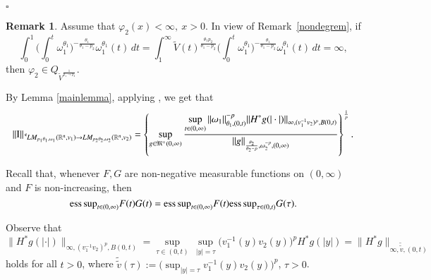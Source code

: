 \documentclass[11pt]{amsart}
\theoremstyle{plain}
\theoremstyle{definition}
\newtheorem{rem}[thm]{Remark}
\numberwithin{thm}{section}
\numberwithin{equation}{section}
\begin{document}
\hspace{16.9cm}$\square$

\begin{rem}
	Assume that ${\varphi}_2(x) < \infty, ~ x > 0$. In view of
	Remark~\ref{nondegrem}, if
	$$
	\int_0^1 \bigg(\int_0^t  {\omega}_1^{{\theta}_1} \bigg)^{-\frac{{\theta}_1}{{\theta}_1 - p_2}}
	{\omega}_1^{{\theta}_1}(t) \,dt = \int_1^{\infty} \widetilde V(t)^{\frac{{\theta}_1 p_2}{{\theta}_1 - p_2}}
	\bigg(\int_0^t  {\omega}_1^{{\theta}_1} \bigg)^{-\frac{{\theta}_1}{{\theta}_1-p_2}} {\omega}_1^{{\theta}_1}(t) \,dt = \infty,
	$$
	then ${\varphi}_2 \in Q_{\widetilde V^{\frac{1}{p_1 {\rightarrow} p_2}}}$.
\end{rem}

By  Lemma \ref{mainlemma}, applying \cite[Theorem~4.2, (b)]{mu_emb},  we get that
\begin{align*}
\|{\operatorname{I}}\|_{{\,^{^{\bf c}}\!} LM_{p_1{\theta}_1,{\omega}_1}({{\mathbb R}^n},v_1){\rightarrow} LM_{p_2{\theta}_2,{\omega}_2}({{\mathbb R}^n},v_2)} = \left\{ \sup_{g\in {\mathfrak M}^+(0,\infty)} {\frac{\displaystyle {\sup_{t\in (0,\infty)} \|{\omega}_1\|_{{\theta}_1,(0,t)}^{-p} \|H^*g(|\cdot|)\|_{\infty,(v_1^{-1}v_2)^{p},B(0,t)}}}{\displaystyle {\|g\|_{\frac{{\theta}_2}{{\theta}_2-p},{\omega}_2^{-p},(0,\infty)}}}} \right\}^{\frac{1}{p}}.
\end{align*}

Recall that, whenever $F,G$ are non-negative measurable functions on $(0,\infty)$ and $F$ is non-increasing, then 
\begin{equation}\label{esupFG1}
{\operatornamewithlimits{ess\,sup}}_{t\in (0,\infty)} F(t)G(t) = {\operatornamewithlimits{ess\,sup}}_{t\in (0,\infty)} F(t) {\operatornamewithlimits{ess\,sup}}_{\tau\in (0,t)} G(\tau).
\end{equation}

Observe that 
\begin{equation}\label{polcorforsup}
\|H^*g(|\cdot|)\|_{\infty,(v_1^{-1}v_2)^p,B(0,t)} = \sup_{\tau\in(0,t)} \, \sup_{|y|=\tau} \big( v_1^{-1}(y) v_2(y)\big)^p H^* g (|y|)  = \|H^*g\|_{\infty,\tilde{\tilde {v}}, (0,t)}
\end{equation}
holds for all $t > 0$, where $\tilde{\tilde {v}}(\tau):= \big(\sup_{|y|=\tau} v_1^{-1}(y)v_2(y)\big)^p$, $\tau > 0$. 
\end{document}
